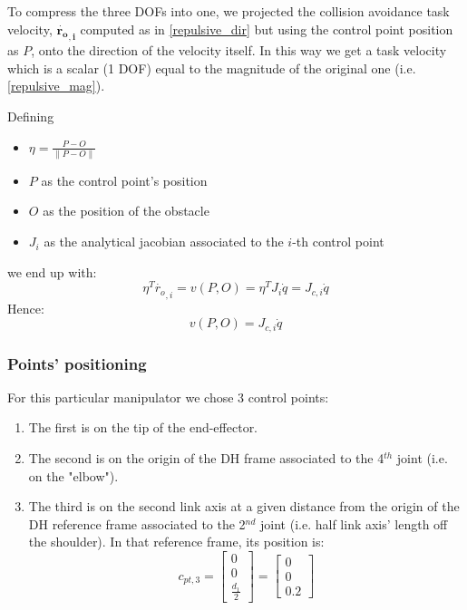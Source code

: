 \documentclass[12pt, a4paper]{article}
\begin{document}
To compress the three DOFs into one, we projected the collision avoidance task velocity, $\mathbf{\dot{r_{o}}_{,i}}$ computed as in \eqref{repulsive_dir} but using the control point position as $P$, onto the direction of the velocity itself. In this way we get a task velocity which is a scalar (1 DOF) equal to the magnitude of the original one (i.e. \eqref{repulsive_mag}).

Defining 
\begin{itemize}
	\item $\eta = \frac{P - O}{\lVert P-O \rVert}$
	\item $P$ as the control point's position
	\item $O$ as the position of the obstacle
	\item $J_i$ as the analytical jacobian associated to the $i$-th control point
\end{itemize}
we end up with:
\begin{equation*}
\eta^T\dot{r_{o}}_{,i} = v(P,O) =\eta^T J_i\dot{q} = J_{c,i}\dot{q}
\end{equation*}
Hence:
\begin{equation}
v(P,O) = J_{c,i}\dot{q}
\end{equation}

\subsubsection{Points' positioning}

For this particular manipulator we chose 3 control points:
\begin{enumerate}
\item The first is on the tip of the end-effector.
\item The second is on the origin of the DH frame associated to the 4$^{th}$ joint (i.e. on the "elbow").
\item The third is on the second link axis at a given distance from the origin of the DH reference frame associated to the 2$^{nd}$ joint (i.e. half link axis' length off the shoulder). In that reference frame, its position is:
\[c_{pt,3} = \begin{bmatrix}
0\\0\\ \frac{d_1}{2}
\end{bmatrix} = \begin{bmatrix}
0\\0\\ 0.2
\end{bmatrix}
\]
\end{enumerate}
\end{document}
